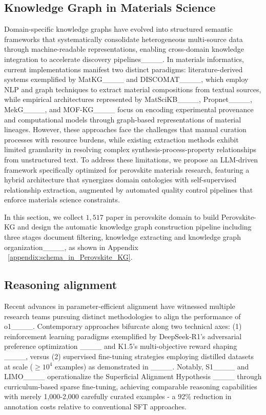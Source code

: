 \subsection{Knowledge Graph in Materials Science}
Domain-specific knowledge graphs have evolved into structured semantic frameworks that systematically consolidate heterogeneous multi-source data through machine-readable representations, enabling cross-domain knowledge integration to accelerate discovery pipelines____. 
In materials informatics, current implementations manifest two distinct paradigms: literature-derived systems exemplified by MatKG____ and DISCOMAT____, which employ NLP and graph techniques to extract material compositions from textual sources, while empirical architectures represented by MatSciKB____, Propnet____, MekG____, and MOF-KG____ focus on encoding experimental provenance and computational models through graph-based representations of material lineages. 
However, these approaches face the challenges that manual curation processes with resource burdens, while existing extraction methods exhibit limited granularity in resolving complex synthesis-process-property relationships from unstructured text. 
To address these limitations, we propose an LLM-driven framework specifically optimized for perovskite materials research, featuring a hybrid architecture that synergizes domain ontologies with self-supervised relationship extraction, augmented by automated quality control pipelines that enforce materials science constraints. 

In this section, we collect $1,517$ paper in perovskite domain to build Perovskite-KG and design the automatic knowledge graph construction pipeline including three stages document filtering, knowledge extracting and knowledge graph organization____, as shown in Appendix ~\ref{appendix:schema_in_Perovskite_KG}.





\subsection{Reasoning alignment}
Recent advances in parameter-efficient alignment have witnessed multiple research teams pursuing distinct methodologies to align the performance of o1____. Contemporary approaches bifurcate along two technical axes: (1) reinforcement learning paradigms exemplified by DeepSeek-R1's adversarial preference optimization ____ and K1.5's multi-objective reward shaping ____, versus (2) supervised fine-tuning strategies employing distilled datasets at scale ($\geq10^4$ examples) as demonstrated in ____. Notably, S1____ and LIMO____ operationalize the Superficial Alignment Hypothesis ____ through curriculum-based sparse fine-tuning, achieving comparable reasoning capabilities with merely 1,000-2,000 carefully curated examples - a 92\% reduction in annotation costs relative to conventional SFT approaches.

